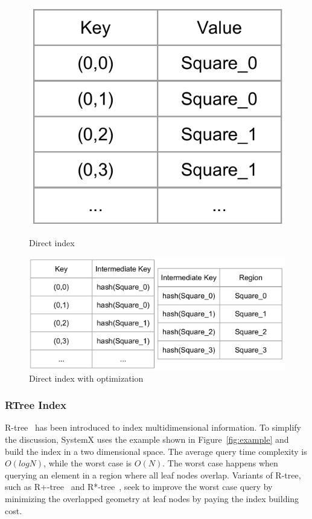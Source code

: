 \documentclass{sig-alternate}
\begin{document}
\begin{figure}
\centering
\begin{minipage}{.3\linewidth}
  \includegraphics[width=\linewidth]{pictures/direct}
  \caption{Direct index}
  \label{fig:direct}
\end{minipage}
\hspace{.05\linewidth}
\begin{minipage}{.6\linewidth}
  \includegraphics[width=\linewidth]{pictures/direct-optimized}
  \caption{Direct index with optimization}
  \label{fig:direct-optimized}
\end{minipage}
\end{figure}


\subsubsection{RTree Index}
R-tree~\cite{guttman1984} has been introduced to index multidimensional information.
To simplify the discussion, SystemX uses the example shown in Figure~\ref{fig:example} and build the index in a two dimensional space.
The average query time complexity is $O(logN)$, while the worst case is $O(N)$. 
The worst case happens when querying an element in a region where all leaf nodes overlap.
Variants of R-tree, such as R+-tree~\cite{sellis1987} and R*-tree~\cite{beckmann1990}, 
seek to improve the worst case query by minimizing the overlapped geometry at leaf nodes 
by paying the index building cost.
\end{document}
